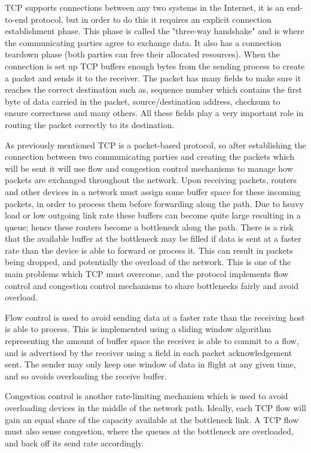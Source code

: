 TCP supports connections between any two systems in the Internet, it is an 
end-to-end protocol, but in order to do this it requires an explicit connection 
establishment phase. This phase is called the "three-way handshake" and is where 
the communicating parties agree to exchange data. It also has a connection 
teardown phase (both parties can free their allocated resources). When the 
connection is set up TCP buffers enough bytes from the sending process to create 
a packet and sends it to the receiver. The packet has many fields to make sure it
reaches the correct destination such as, sequence number which contains the 
first byte of data carried in the packet, source/destination address, checksum 
to ensure correctness and many others. All these fields play a very important 
role in routing the packet correctly to its destination. 
  
As previously mentioned TCP is a packet-based protocol, so after establishing
the connection between two communicating parties and creating the packets which 
will be sent it will use flow and congestion control mechanisms to manage how 
packets are exchanged throughout the network. Upon receiving packets, routers 
and other devices in a network must assign some buffer space for these incoming 
packets, in order to process them before forwarding along the path. Due to heavy 
load or low outgoing link rate these buffers can become quite large resulting in 
a queue; hence these routers become a bottleneck along the path. There is a risk 
that the available buffer at the bottleneck may be filled if data is sent at a 
faster rate than the device is able to forward or process it. This can result in 
packets being dropped, and potentially the overload of the network. This is one 
of the main problems which TCP must overcome, and the protocol implements flow 
control and congestion control mechanisms to share bottlenecks fairly and avoid 
overload.

Flow control is used to avoid sending data at a faster rate than the receiving
host is able to process. This is implemented using a sliding window algorithm 
representing the amount of buffer space the receiver is able to commit to a
flow, and is advertised by the receiver using a field in each packet 
acknowledgement sent. The sender may only keep one window of data in flight at
any given time, and so avoids overloading the receive buffer.

Congestion control is another rate-limiting mechanism which is used to avoid
overloading devices in the middle of the network path. Ideally, each TCP flow
will gain an equal share of the capacity available at the bottleneck link. A TCP
flow must also sense congestion, where the queues at the bottleneck are
overloaded, and back off its send rate accordingly.


